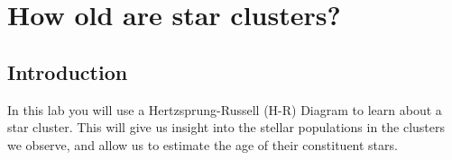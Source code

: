 \chapter{How old are star clusters?}


%
%
%
%
%
%
%
%
%
%


\section{Introduction}

In this lab you will use a Hertzsprung-Russell (H-R) Diagram to learn about a star cluster. This will give us insight into the stellar populations in the clusters we observe, and allow us to estimate the age of their constituent stars. 

